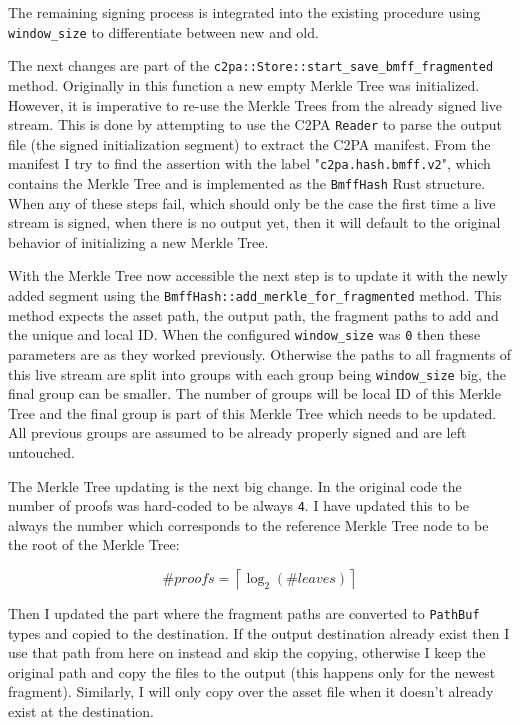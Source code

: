 The remaining signing process is integrated into the existing procedure using \texttt{window\_size} to differentiate between new and old.

The next changes are part of the \texttt{c2pa::Store::start\_save\_bmff\_fragmented} method. Originally in this function a new empty Merkle Tree was initialized. However, it is imperative to re-use the Merkle Trees from the already signed live stream. This is done by attempting to use the C2PA \texttt{Reader} to parse the output file (the signed initialization segment) to extract the C2PA manifest. From the manifest I try to find the assertion with the label "\texttt{c2pa.hash.bmff.v2}", which contains the Merkle Tree and is implemented as the \texttt{BmffHash} Rust structure. When any of these steps fail, which should only be the case the first time a live stream is signed, when there is no output yet, then it will default to the original behavior of initializing a new Merkle Tree.

With the Merkle Tree now accessible the next step is to update it with the newly added segment using the \texttt{BmffHash::add\_merkle\_for\_fragmented} method. This method expects the asset path, the output path, the fragment paths to add and the unique and local ID. When the configured \texttt{window\_size} was \texttt{0} then these parameters are as they worked previously. Otherwise the paths to all fragments of this live stream are split into groups with each group being \texttt{window\_size} big, the final group can be smaller. The number of groups will be local ID of this Merkle Tree and the final group is part of this Merkle Tree which needs to be updated. All previous groups are assumed to be already properly signed and are left untouched.

The Merkle Tree updating is the next big change. In the original code the number of proofs was hard-coded to be always \texttt{4}. I have updated this to be always the number which corresponds to the reference Merkle Tree node to be the root of the Merkle Tree:

\begin{equation}
    \#proofs = \left\lceil \log_2({\#leaves}) \right\rceil
    \label{eq:proofs}
\end{equation}

Then I updated the part where the fragment paths are converted to \texttt{PathBuf} types and copied to the destination. If the output destination already exist then I use that path from here on instead and skip the copying, otherwise I keep the original path and copy the files to the output (this happens only for the newest fragment). Similarly, I will only copy over the asset file when it doesn't already exist at the destination.

